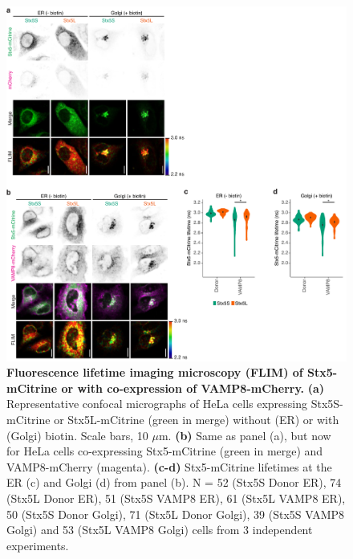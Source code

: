 \begin{figure}
    \includegraphics[keepaspectratio=true,width=\textwidth,height=\textheight]{chapters/chapter6/chapter6_SupplementaryFigure17.pdf}
    \caption{\textbf{Fluorescence lifetime imaging microscopy (FLIM) of Stx5-mCitrine or with co-expression of VAMP8-mCherry.} \textbf{(a)} Representative confocal micrographs of HeLa cells expressing Stx5S-mCitrine or Stx5L-mCitrine (green in merge) without (ER) or with (Golgi) biotin. Scale bars, 10 $\mu$m. \textbf{(b)} Same as panel (a), but now for HeLa cells co-expressing Stx5-mCitrine (green in merge) and VAMP8-mCherry (magenta). \textbf{(c-d)} Stx5-mCitrine lifetimes at the ER (c) and Golgi (d) from panel (b). N = 52 (Stx5S Donor ER), 74 (Stx5L Donor ER), 51 (Stx5S VAMP8 ER), 61 (Stx5L VAMP8 ER), 50 (Stx5S Donor Golgi), 71 (Stx5L Donor Golgi), 39 (Stx5S VAMP8 Golgi) and 53 (Stx5L VAMP8 Golgi) cells from 3 independent experiments.}
    \label{fig:ch6supfig17}
\end{figure}

\clearpage

